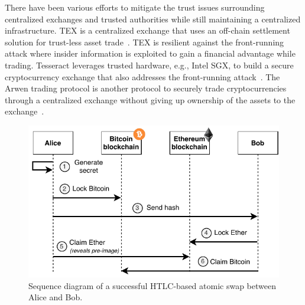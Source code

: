 There have been various efforts to mitigate the trust issues surrounding centralized exchanges and trusted authorities while still maintaining a centralized infrastructure.
TEX is a centralized exchange that uses an off-chain settlement solution for trust-less asset trade~\cite{khalil2019tex}.
TEX is resilient against the front-running attack where insider information is exploited to gain a financial advantage while trading.
Tesseract leverages trusted hardware, e.g., Intel SGX, to build a secure cryptocurrency exchange that also addresses the front-running attack~\cite{bentov2019tesseract}.
The Arwen trading protocol is another protocol to securely trade cryptocurrencies through a centralized exchange without giving up ownership of the assets to the exchange~\cite{heilman2020arwen}.


\begin{figure}[t]
	\centering
	\includegraphics[width=.7\linewidth]{xchange/assets/atomic_swap}
	\caption{Sequence diagram of a successful HTLC-based atomic swap between Alice and Bob.}
	\label{fig:atomic_swap}
\end{figure}

